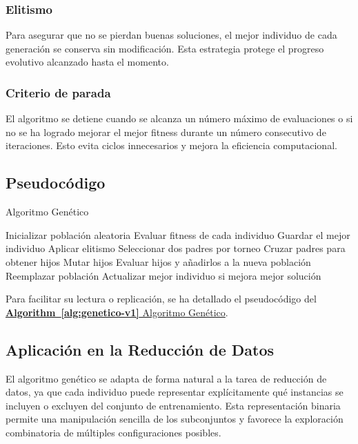 \subsubsection{Elitismo}
Para asegurar que no se pierdan buenas soluciones, el mejor individuo de cada generación se conserva sin modificación.
Esta estrategia protege el progreso evolutivo alcanzado hasta el momento.
\subsubsection{Criterio de parada}
El algoritmo se detiene cuando se alcanza un número máximo de evaluaciones o si no se ha logrado mejorar el mejor fitness durante un número consecutivo de iteraciones.
Esto evita ciclos innecesarios y mejora la eficiencia computacional.

\subsection{Pseudocódigo}\label{subsec:Pseudocodigo-genetico-v1}
\begin{algorithm}[htp]
      \caption{Algoritmo Genético}
      \label{alg:genetico-v1}
      \begin{algorithmic}[1]
            \State Inicializar población aleatoria
            \State Evaluar fitness de cada individuo
            \State Guardar el mejor individuo
            \State Aplicar elitismo
            \State Seleccionar dos padres por torneo
            \State Cruzar padres para obtener hijos
            \State Mutar hijos
            \State Evaluar hijos y añadirlos a la nueva población
            \EndWhile
            \State Reemplazar población
            \State Actualizar mejor individuo si mejora
            \EndWhile
            \State \Return mejor solución
      \end{algorithmic}
\end{algorithm}

Para facilitar su lectura o replicación, se ha detallado el pseudocódigo del \hyperref[alg:genetico-v1]{\textbf{Algorithm~\ref*{alg:genetico-v1}} Algoritmo Genético}.

\subsection{Aplicación en la Reducción de Datos}\label{subsec:aplicacion-en-la-reduccion-de-datos-genetico-v1}
El algoritmo genético se adapta de forma natural a la tarea de reducción de datos, ya que cada individuo puede
representar explícitamente qué instancias se incluyen o excluyen del conjunto de entrenamiento.
Esta representación binaria permite una manipulación sencilla de los subconjuntos y favorece la exploración combinatoria de múltiples configuraciones posibles.

